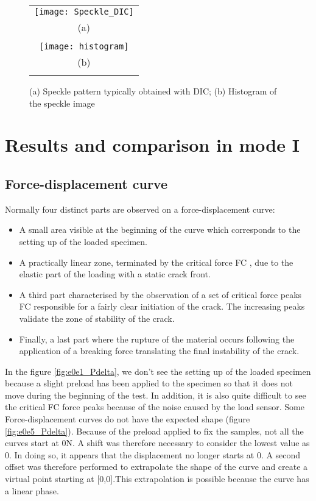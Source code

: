 \begin{figure}[htp]
	\centering
	\begin{tabular}{c}
		\texttt{[image: Speckle\_DIC]} \\
		(a) \\
		\\
		\texttt{[image: histogram]} \\
		(b) \\
		\\
	\end{tabular}
	\caption{(a) Speckle pattern typically obtained with DIC; (b) Histogram of the speckle image}
	\label{fig:Speckle_DIC}
\end{figure}

\section{Results and comparison in mode I}

\subsection{Force-displacement curve}

Normally four distinct parts are observed on a force-displacement curve:

\begin{itemize}
	\item A small area visible at the beginning of the curve which corresponds to the setting up of the loaded specimen. 
	\item A practically linear zone, terminated by the critical force FC , due to the elastic part of the loading with a static crack front.
	\item A third part characterised by the observation of a set of critical force peaks FC responsible for a fairly clear initiation of the crack. The increasing peaks validate the zone of stability of the crack.
	\item Finally, a last part where the rupture of the material occurs following the application of a breaking force translating the final instability of the crack.
\end{itemize}

 In the figure \ref{fig:e0e1_Pdelta}, we don't see the setting up of the loaded specimen because a slight preload has been applied to the specimen so that it does not move during the beginning of the test. In addition, it is also quite difficult to see the critical FC force peaks because of the noise caused by the load sensor.
 Some Force-displacement curves do not have the expected shape (figure \ref{fig:e0e5_Pdelta}). Because of the preload applied to fix the samples, not all the curves start at 0N. A shift was therefore necessary to consider the lowest value as 0. In doing so, it appears that the displacement no longer starts at 0. A second offset was therefore performed to extrapolate the shape of the curve and create a virtual point starting at [0,0].This extrapolation is possible because the curve has a linear phase.


